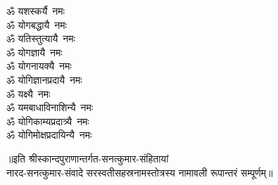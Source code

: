 \begin{flushleft}
\begin{multicols}{2}
ॐ यशस्कर्यै~नमः\\
ॐ योगबद्धायै~नमः\hfill{}\\
ॐ यतिस्तुत्यायै~नमः\\
ॐ योगज्ञायै~नमः\\
ॐ योगनायक्यै~नमः\\
ॐ योगिज्ञानप्रदायै~नमः\\
ॐ यक्ष्यै~नमः\\
ॐ यमबाधाविनाशिन्यै~नमः\\
ॐ योगिकाम्यप्रदात्र्यै~नमः\\
ॐ योगिमोक्षप्रदायिन्यै~नमः\\
\end{multicols}
\end{flushleft}
॥इति श्रीस्कान्दपुराणान्तर्गत-सनत्कुमार-संहितायां\\नारद-सनत्कुमार-संवादे सरस्वतीसहस्रनामस्तोत्रस्य नामावली रूपान्तरं सम्पूर्णम्॥
